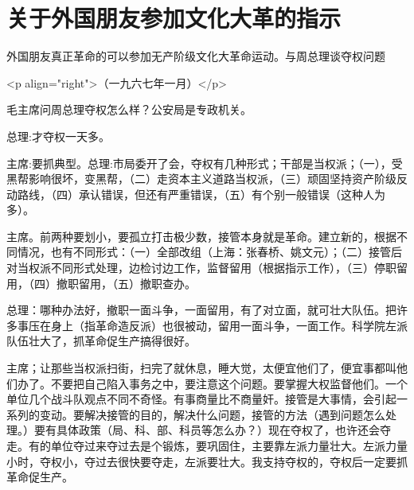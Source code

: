 \section[关于外国朋友参加文化大革的指示（一九六七年一月二十八日）]{关于外国朋友参加文化大革的指示}


外国朋友真正革命的可以参加无产阶级文化大革命运动。与周总理谈夺权问题

<p align="right">（一九六七年一月）</p>

毛主席问周总理夺权怎么样？公安局是专政机关。

总理:才夺权一天多。

主席:要抓典型。总理:市局委开了会，夺权有几种形式；干部是当权派；（一），受黑帮影响很坏，变黑帮，（二）走资本主义道路当权派，（三）顽固坚持资产阶级反动路线，（四）承认错误，但还有严重错误，（五）有个别一般错误（这种人为多）。

主席。前两种要划小，要孤立打击极少数，接管本身就是革命。建立新的，根据不同情况，也有不同形式：（一）全部改组（上海：张春桥、姚文元）；（二）接管后对当权派不同形式处理，边检讨边工作，监督留用（根据指示工作），（三）停职留用，（四）撤职留用，（五）撤职查办。

总理：哪种办法好，撤职一面斗争，一面留用，有了对立面，就可壮大队伍。把许多事压在身上（指革命造反派）也很被动，留用一面斗争，一面工作。科学院左派队伍壮大了，抓革命促生产搞得很好。

主席；让那些当权派扫街，扫完了就休息，睡大觉，太便宜他们了，便宜事都叫他们办了。不要把自己陷入事务之中，要注意这个问题。要掌握大权监督他们。一个单位几个战斗队观点不同不奇怪。有事商量比不商量奸。接管是大事情，会引起一系列的变动。要解决接管的目的，解决什么问题，接管的方法（遇到问题怎么处理。）要有具体政策（局、科、部、科员等怎么办？）现在夺权了，也许还会夺走。有的单位夺过来夺过去是个锻炼，要巩固住，主要靠左派力量壮大。左派力量小时，夺权小，夺过去很快要夺走，左派要壮大。我支持夺权的，夺权后一定要抓革命促生产。


